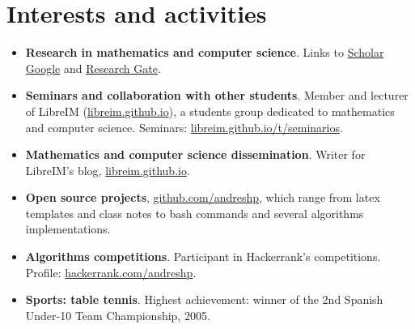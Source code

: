 \documentclass[10pt,a4paper,sans]{moderncv} %
\begin{document}
\section{Interests and activities}
\begin{itemize}
    \item \textbf{Research in mathematics and computer science}. Links to \textcolor{colorl}{\href{https://scholar.google.es/citations?user=oLAt2JsAAAAJ&hl=es}{Scholar Google}} and \textcolor{colorl}{\href{https://www.researchgate.net/profile/Andres_Herrera-Poyatos}{Research Gate}}.
    \item \textbf{Seminars and collaboration with other students}. Member and lecturer of LibreIM (\textcolor{colorl}{\url{libreim.github.io}}), a students group dedicated to mathematics and computer science.
      Seminars: \textcolor{colorl}{\url{libreim.github.io/t/seminarios}}.
    \item \textbf{Mathematics and computer science dissemination}. Writer for LibreIM's blog, \textcolor{colorl}{\url{libreim.github.io}}.
    \item \textbf{Open source projects}, \textcolor{colorl}{\url{github.com/andreshp}}, which range from latex templates and class notes to bash commands and several algorithms implementations.
    \item \textbf{Algorithms competitions}. Participant in Hackerrank's competitions. Profile: \textcolor{colorl}{\url{hackerrank.com/andreshp}}.
    \item \textbf{Sports: table tennis}. Highest achievement: winner of the 2nd Spanish Under-10 Team Championship, 2005.
\end{itemize}
\end{document}
